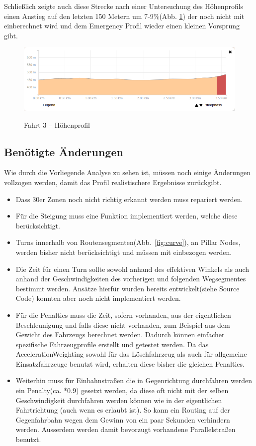 Schließlich zeigte auch diese Strecke nach einer Untersuchung des Höhenprofils einen Anstieg auf den letzten 150 Metern um 7-9$\%$(Abb. \ref{fig:profile2}) der noch nicht mit einberechnet wird und dem Emergency Profil wieder einen kleinen Vorsprung gibt.

\begin{figure}[h]
\centering
\caption{Fahrt 3 -- Höhenprofil}
\label{fig:profile2}
\includegraphics[width = 0.90 \textwidth]{../media/Fahrt3_Profile.png} \\
\end{figure}


\subsection{Benötigte Änderungen}

Wie durch die Vorliegende Analyse zu sehen ist, müssen noch einige Änderungen vollzogen werden, damit das Profil realistischere Ergebnisse zurückgibt.\par
\begin{itemize}
\item Dass 30er Zonen noch nicht richtig erkannt werden muss repariert werden.
\item Für die Steigung muss eine Funktion implementiert werden, welche diese berücksichtigt.
\item Turns innerhalb von Routensegmenten(Abb.~\ref{fig:curve}), an Pillar Nodes, werden bisher nicht berücksichtigt und müssen mit einbezogen werden.
\item Die Zeit für einen Turn sollte sowohl anhand des effektiven Winkels als auch anhand der Geschwindigkeiten des vorherigen und folgenden Wegsegmentes bestimmt werden.
Ansätze hierfür wurden bereits entwickelt(siehe Source Code) konnten aber noch nicht implementiert werden.
\item Für die Penalties muss die Zeit, sofern vorhanden, aus der eigentlichen Beschleunigung und falls diese nicht vorhanden, zum Beispiel aus dem Gewicht des Fahrzeugs berechnet werden.
Dadurch können einfacher spezifische Fahrzeugprofile erstellt und getestet werden.
Da das AccelerationWeighting sowohl für das Löschfahrzeug als auch für allgemeine Einsatzfahrzeuge benutzt wird, erhalten diese bisher die gleichen Penalties.
\item Weiterhin muss für Einbahnstraßen die in Gegenrichtung durchfahren werden ein Penalty(ca. *0.9) gesetzt werden, da diese oft nicht mit der selben Geschwindigkeit durchfahren werden können wie in der eigentlichen Fahrtrichtung (auch wenn es erlaubt ist).
So kann ein Routing auf der Gegenfahrbahn wegen dem Gewinn von ein paar Sekunden verhindern werden.
Ausserdem werden damit bevorzugt vorhandene Parallelstraßen benutzt.
\end{itemize}